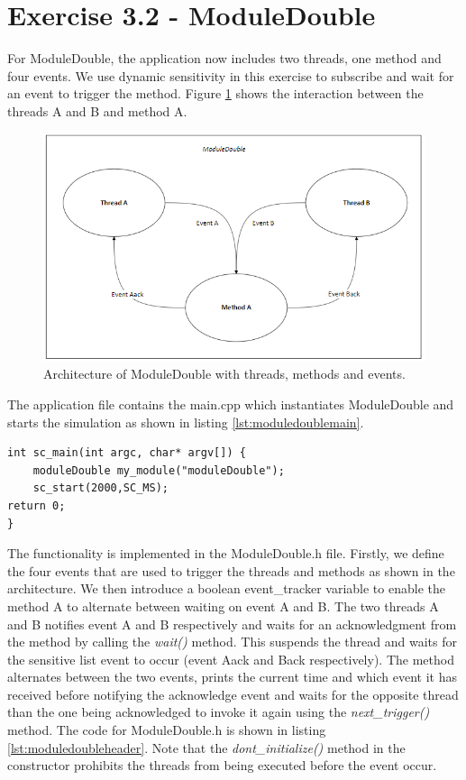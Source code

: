 \section{Exercise 3.2 - ModuleDouble}

For ModuleDouble, the application now includes two threads, one method and four events. We use dynamic sensitivity in this exercise to subscribe and wait for an event to trigger the method. Figure \ref{fig:moduledouble} shows the interaction between the threads A and B and method A.

\begin{figure}[h]
	\centering
	\includegraphics[width=1\linewidth]{ModuleDouble.png}
	\caption{Architecture of ModuleDouble with threads, methods and events.}
	\label{fig:moduledouble}
\end{figure}

\noindent The application file contains the main.cpp which instantiates ModuleDouble and starts the simulation as shown in listing \ref{lst:moduledoublemain}.

\begin{lstlisting}[style=customc++, caption=Application file for ModuleDouble.,
label={lst:moduledoublemain}]
int sc_main(int argc, char* argv[]) {
	moduleDouble my_module("moduleDouble");
	sc_start(2000,SC_MS);
return 0;
}
\end{lstlisting}

\noindent The functionality is implemented in the ModuleDouble.h file. Firstly, we define the four events that are used to trigger the threads and methods as shown in the architecture. We then introduce a boolean event\_tracker variable to enable the method A to alternate between waiting on event A and B. The two threads A and B notifies event A and B respectively and waits for an acknowledgment from the method by calling the \textit{wait()} method. This suspends the thread and waits for the sensitive list event to occur (event Aack and Back respectively). The method alternates between the two events, prints the current time and which event it has received before notifying the acknowledge event and waits for the opposite thread than the one being acknowledged to invoke it again using the \textit{next\_trigger()} method. The code for ModuleDouble.h is shown in listing \ref{lst:moduledoubleheader}. Note that the \textit{dont\_initialize()} method in the constructor prohibits the threads from being executed before the event occur.

